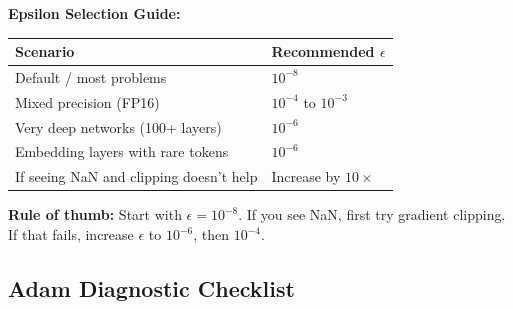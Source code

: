 \documentclass[../../main.tex]{subfiles}
\begin{document}
\begin{keyconcept}
\textbf{Epsilon Selection Guide:}

\begin{center}
\begin{tabular}{ll}
\toprule
\textbf{Scenario} & \textbf{Recommended $\epsilon$} \\
\midrule
Default / most problems & $10^{-8}$ \\
Mixed precision (FP16) & $10^{-4}$ to $10^{-3}$ \\
Very deep networks (100+ layers) & $10^{-6}$ \\
Embedding layers with rare tokens & $10^{-6}$ \\
If seeing NaN and clipping doesn't help & Increase by $10\times$ \\
\bottomrule
\end{tabular}
\end{center}

\textbf{Rule of thumb:} Start with $\epsilon = 10^{-8}$. If you see NaN, first try gradient clipping. If that fails, increase $\epsilon$ to $10^{-6}$, then $10^{-4}$.
\end{keyconcept}

\subsection{Adam Diagnostic Checklist}
\end{document}
